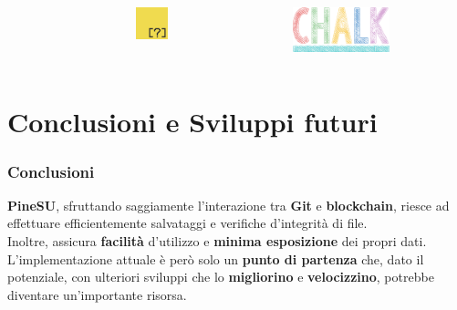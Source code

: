 \documentclass{beamer}
\begin{document}
\begin{frame}
\begin{columns}
\begin{figure}
		\end{figure} 
		\bigskip
		\centering
		\bigskip\bigskip\bigskip
		\begin{figure}
			\includegraphics[width=0.5\textwidth]{figures/inquirer.png}
		\end{figure}
		\bigskip\bigskip
		\begin{figure}
			\includegraphics[width=0.7\textwidth]{figures/chalk.png}
		\end{figure} 
	\end{columns}
\end{frame}

\section{Conclusioni e Sviluppi futuri}
\begin{frame}
	\frametitle{Conclusioni}
	\textbf{PineSU}, sfruttando saggiamente l'interazione tra \textbf{Git} e \textbf{blockchain},
	riesce ad effettuare efficientemente salvataggi e verifiche d'integrità di file.\\
	Inoltre, assicura \textbf{facilità} d'utilizzo e \textbf{minima esposizione} dei propri dati.\\
	L'implementazione attuale è però solo un \textbf{punto di partenza} che, dato il potenziale,
	con ulteriori sviluppi che lo \textbf{migliorino} e \textbf{velocizzino}, potrebbe diventare un'importante risorsa.
\end{frame}
\end{document}
